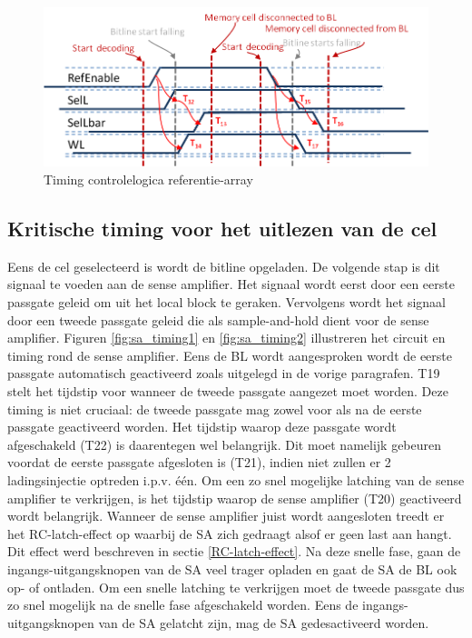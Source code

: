 \begin{figure}[!ht]
  \centering
  \includegraphics[scale=0.9]{../fig/hfdstk-timing-lbref2.png}
  \caption[Referentie-array:timing]{Timing controlelogica referentie-array}
  \label{fig:lbref_timing2}
\end{figure}

\subsection{Kritische timing voor het uitlezen van de cel}
Eens de cel geselecteerd is wordt de bitline opgeladen. De volgende stap is dit signaal te voeden aan de sense amplifier. Het signaal wordt eerst door een eerste passgate geleid om uit het local block te geraken. Vervolgens wordt het signaal door een tweede passgate geleid die als sample-and-hold dient voor de sense amplifier. Figuren \ref{fig:sa_timing1} en \ref{fig:sa_timing2} illustreren het circuit en timing rond de sense amplifier. Eens de BL wordt aangesproken wordt de eerste passgate automatisch geactiveerd zoals uitgelegd in de vorige paragrafen. T19 stelt het tijdstip voor wanneer de tweede passgate aangezet moet worden. Deze timing is niet cruciaal: de tweede passgate mag zowel voor als na de eerste passgate geactiveerd worden. Het tijdstip waarop deze passgate wordt afgeschakeld (T22) is daarentegen wel belangrijk. Dit moet namelijk gebeuren voordat de eerste passgate afgesloten is (T21), indien niet zullen er 2 ladingsinjectie optreden i.p.v. één. Om een zo snel mogelijke latching van de sense amplifier te verkrijgen, is het tijdstip waarop de sense amplifier (T20) geactiveerd wordt belangrijk. Wanneer de sense amplifier juist wordt aangesloten treedt er het RC-latch-effect op waarbij de SA zich gedraagt alsof er geen last aan hangt. Dit effect werd beschreven in sectie \ref{RC-latch-effect}. Na deze snelle fase, gaan de ingangs-uitgangsknopen van de SA veel trager opladen en gaat de SA de BL ook op- of ontladen. Om een snelle latching te verkrijgen moet de tweede passgate dus zo snel mogelijk na de snelle fase afgeschakeld worden. Eens de ingangs-uitgangsknopen van de SA gelatcht zijn, mag de SA gedesactiveerd worden.


